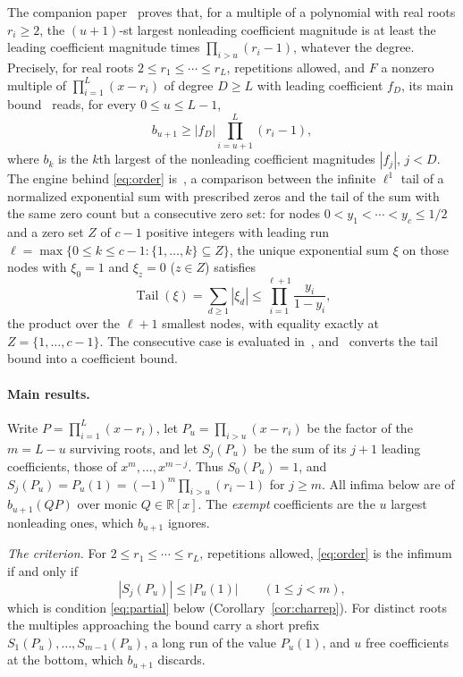 \documentclass[11pt]{article}
\theoremstyle{definition}
\theoremstyle{plain}
\newcommand{\R}{\mathbb R}
\DeclareMathOperator{\Tail}{Tail}
\begin{document}
The companion paper~\cite{coefficient-mass} proves that, for a multiple of a
polynomial with real roots $r_i\ge2$, the $(u+1)$-st largest nonleading
coefficient magnitude is at least the leading coefficient magnitude times
$\prod_{i>u}(r_i-1)$, whatever the degree.
Precisely, for real roots $2\le r_1\le\cdots\le r_L$, repetitions allowed, and $F$ a
nonzero multiple of $\prod_{i=1}^L(x-r_i)$ of degree $D\ge L$ with leading
coefficient $f_D$, its main bound~\cite[Theorem~3.2]{coefficient-mass} reads,
for every $0\le u\le L-1$,
\begin{equation}\label{eq:order}
  b_{u+1}\ge|f_D|\prod_{i=u+1}^L(r_i-1),
\end{equation}
where $b_k$ is the $k$th largest of the nonleading coefficient magnitudes
$|f_j|$, $j<D$.  The engine behind \eqref{eq:order}
is~\cite[Theorem~2.2]{coefficient-mass}, a
comparison between the infinite $\ell^1$ tail of a normalized exponential
sum with prescribed zeros and the tail of the sum with the same zero count
but a consecutive zero set: for nodes $0<y_1<\cdots<y_c\le1/2$ and a zero
set $Z$ of $c-1$ positive integers with leading run
$\ell=\max\{0\le k\le c-1:\{1,\ldots,k\}\subseteq Z\}$, the unique exponential
sum $\xi$ on those nodes with $\xi_0=1$ and $\xi_z=0$ ($z\in Z$) satisfies
\[
  \Tail(\xi)=\sum_{d\ge1}|\xi_d|\le\prod_{i=1}^{\ell+1}\frac{y_i}{1-y_i},
\]
the product over the $\ell+1$ smallest nodes, with equality exactly at $Z=\{1,\ldots,c-1\}$.
The consecutive case is evaluated in~\cite[Lemma~2.1]{coefficient-mass},
and~\cite[Lemma~3.1]{coefficient-mass} converts the tail bound into a
coefficient bound.

\paragraph{Main results.}  Write $P=\prod_{i=1}^L(x-r_i)$, let
$P_u=\prod_{i>u}(x-r_i)$ be the factor of the $m=L-u$ surviving roots, and let
$S_j(P_u)$ be the sum of its $j+1$ leading coefficients, those of
$x^m,\ldots,x^{m-j}$.  Thus $S_0(P_u)=1$, and
$S_j(P_u)=P_u(1)=(-1)^m\prod_{i>u}(r_i-1)$ for $j\ge m$.  All infima below
are of $b_{u+1}(QP)$ over monic $Q\in\R[x]$.  The \emph{exempt}
coefficients are the $u$ largest nonleading ones, which $b_{u+1}$ ignores.

\emph{The criterion.}  For $2\le r_1\le\cdots\le r_L$, repetitions allowed,
\eqref{eq:order} is the infimum if and only if
\[
  |S_j(P_u)|\le|P_u(1)|\qquad(1\le j<m),
\]
which is condition \eqref{eq:partial} below (Corollary~\ref{cor:charrep}).
For distinct roots the multiples approaching the bound carry a short prefix
$S_1(P_u),\ldots,S_{m-1}(P_u)$, a long run of the value $P_u(1)$, and $u$
free coefficients at the bottom, which $b_{u+1}$ discards.
\end{document}

